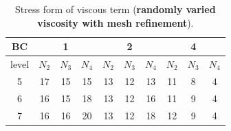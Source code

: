 \documentclass[9pt]{article}
\begin{document}
\begin{table}[h]
\begin{center}
\begin{tabular}{|c||ccc|ccc|ccc|}
\hline
      BC  &     &1    &    &    &2   &     &   &4     & \\
\hline
 level &$N_2$ &$N_3$ &$N_4$   &$N_2$ &$N_3$ &$N_4$   &$N_2$ & $N_3$ &$N_4$  \\
\hline
\hline
  5   &17  &15 &15    &13  &12 &13     &11   &8   &4\\   %
\hline
  6   &16  &15 &18    &13  &12 &16     &11   &9   &4\\   %
\hline
  7   &16  &16 &20    &13  &12 &18     &12   &9   &4\\   %
\hline
\end{tabular}
\vspace{2mm} \caption{Stress form of viscous term ({\bf randomly varied viscosity with mesh refinement}).
}
\end{center}
\end{table}

\end{document}
